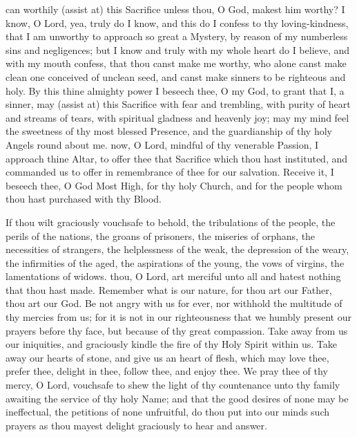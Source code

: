  can worthily (assist at) this Sacrifice unless thou, O God, makest him worthy? I know, O Lord, yea, truly do I know, and this do I confess to thy loving-kindness, that I am unworthy to approach so great a Mystery, by reason of my numberless sins and negligences; but I know and truly with my whole heart do I believe, and with my mouth confess, that thou canst make me worthy, who alone canst make clean one conceived of unclean seed, and canst make sinners to be righteous and holy. By this thine almighty power I beseech thee, O my God, to grant that I, a sinner, may (assist at) this Sacrifice with fear and trembling, with purity of heart and streams of tears, with spiritual gladness and heavenly joy; may my mind feel the sweetness of thy most blessed Presence, and the guardianship of thy holy Angels round about me.
 now, O Lord, mindful of thy venerable Passion, I approach thine Altar, to offer thee that Sacrifice which thou hast instituted, and commanded us to offer in remembrance of thee for our salvation. Receive it, I beseech thee, O God Most High, for thy holy Church, and for the people whom thou hast purchased with thy Blood.
\par
If thou wilt graciously vouchsafe to behold,\textsuperscript{} 
\reversemarginpar
{}
the tribulations of the people, the perils of the nations, the groans of prisoners, the miseries of orphans, the necessities of strangers, the helplessness of the weak, the depression of the weary, the infirmities of the aged, the aspirations of the young, the vows of virgins, the lamentations of widows.
\clearpage
\normalmarginpar%
 thou, O Lord, art merciful unto all and hatest nothing that thou hast made. Remember what is our nature, for thou art our Father, thou art our God. Be not angry with us for ever, nor withhold the multitude of thy mercies from us; for it is not in our righteousness that we humbly present our prayers before thy face, but because of thy great compassion. Take away from us our iniquities, and graciously kindle the fire of thy Holy Spirit within us. Take away our hearts of stone, and give us an heart of flesh, which may love thee, prefer thee, delight in thee, follow thee, and enjoy thee. We pray thee of thy mercy, O Lord, vouchsafe to shew the light of thy countenance unto thy family awaiting the service of thy holy Name; and that the good desires of none may be ineffectual, the petitions of none unfruitful, do thou put into our minds such prayers as thou mayest delight graciously to hear and answer. 
